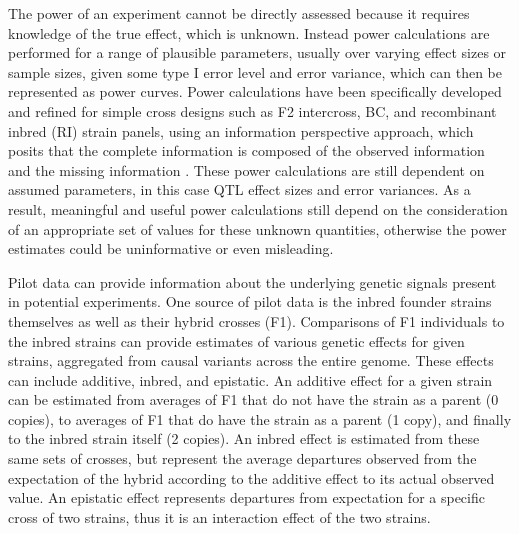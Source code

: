 
The power of an experiment cannot be directly assessed because it requires knowledge of the true effect, which is unknown. Instead power calculations are performed for a range of plausible parameters, usually over varying effect sizes or sample sizes, given some type I error level and error variance, which can then be represented as power curves. Power calculations have been specifically developed and refined for simple cross designs such as F2 intercross, BC, and recombinant inbred (RI) strain panels, using an information perspective approach, which posits that the complete information is composed of the observed information and the missing information \citep{Sen2005}. These power calculations are still dependent on assumed parameters, in this case QTL effect sizes and error variances. As a result, meaningful and useful power calculations still depend on the consideration of an appropriate set of values for these unknown quantities, otherwise the power estimates could be uninformative or even misleading.


Pilot data can provide information about the underlying genetic signals present in potential experiments. One  source of pilot data is the inbred founder strains themselves as well as their hybrid crosses (F1). Comparisons of F1 individuals to the inbred strains can provide estimates of various genetic effects for given strains, aggregated from causal variants across the entire genome. These effects can include additive, inbred, and epistatic. An additive effect for a given strain can be estimated from averages of F1 that do not have the strain as a parent (0 copies), to averages of F1 that do have the strain as a parent (1 copy), and finally to the inbred strain itself (2 copies). An inbred effect is estimated from these same sets of crosses, but represent the average departures observed from the expectation of the hybrid according to the additive effect to its actual observed value. An epistatic effect represents departures from expectation for a specific cross of two strains, thus it is an interaction effect of the two strains.


